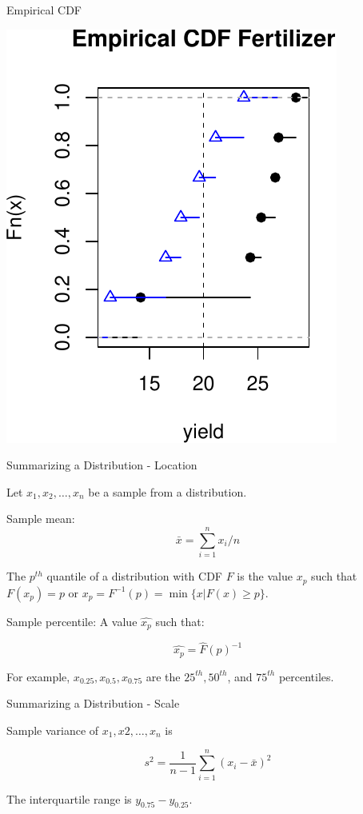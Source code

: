 \documentclass[10pt,ignorenonframetext,]{beamer}
\begin{document}
\begin{frame}{Empirical CDF}

\includegraphics{class3slides-jan16_files/figure-beamer/unnamed-chunk-3-1.pdf}

\end{frame}

\begin{frame}{Summarizing a Distribution - Location}

Let \(x_1, x_2, \ldots, x_n\) be a sample from a distribution.

Sample mean: \[{\bar x}=\sum_{i=1}^{n}x_i/n\]

The \(p^{th}\) quantile of a distribution with CDF \(F\) is the value
\(x_p\) such that \({F}(x_p)=p\) or
\(x_p=F^{-1}(p)=\min\{x | F(x) \ge p \}\).

Sample percentile: A value \(\hat{x_{p}}\) such that:

\[\hat{x_{p}}= {\hat F}(p)^{-1}\]

For example, \(x_{0.25},x_{0.5},x_{0.75}\) are the \(25^{th},50^{th}\),
and \(75^{th}\) percentiles.

\end{frame}

\begin{frame}{Summarizing a Distribution - Scale}

Sample variance of \(x_1, x2, \ldots, x_n\) is

\[ s^2 =\frac{1}{n-1}\sum_{i=1}^{n}\left(x_i-{\bar x}\right)^2\]

The interquartile range is \(y_{0.75}-y_{0.25}\).

\end{frame}
\end{document}
